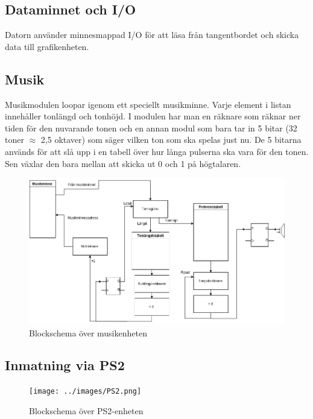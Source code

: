 \documentclass[a4paper,titlepage]{article}
\begin{document}
\subsection{Dataminnet och I/O}

Datorn använder minnesmappad I/O för att läsa från tangentbordet och skicka data
till grafik\-enheten.


\subsection{Musik}

Musikmodulen loopar igenom ett speciellt musikminne. Varje element i listan
innehåller tonlängd och tonhöjd. I modulen har man en räknare som räknar ner
tiden för den nuvarande tonen och en annan modul som bara tar in 5 bitar (32
toner $\approx$ 2,5 oktaver) som säger vilken ton som ska spelas just nu. De 5
bitarna används för att slå upp i en tabell över hur långa pulserna ska vara för
den tonen. Sen växlar den bara mellan att skicka ut 0 och 1 på högtalaren.

\begin{figure}[H]
	\centering
\includegraphics[width=14cm]{../images/Musik.png}
\caption{Blockschema över musikenheten\label{musicscheme}}
\end{figure}

\subsection{Inmatning via PS2}

\begin{figure}[H]
	\centering
\texttt{[image: ../images/PS2.png]}
\caption{Blockschema över PS2-enheten\label{ps2scheme}}
\end{figure}
\end{document}
